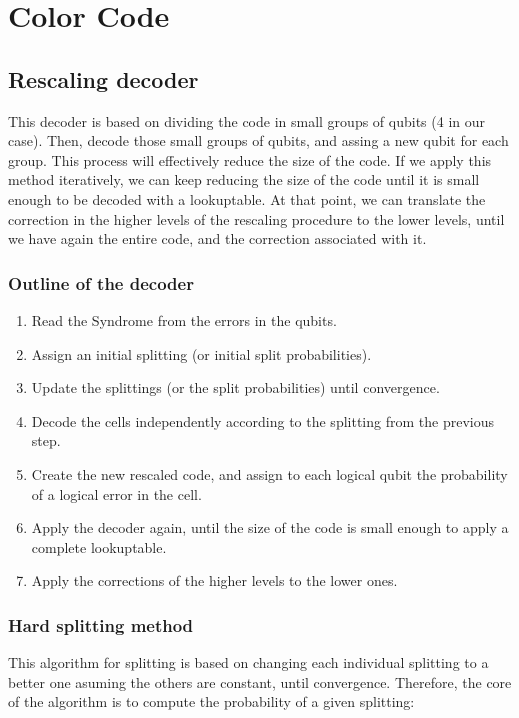 \documentclass[a4paper,12pt]{article}
\begin{document}
\newpage

\section{Color Code}
\subsection{Rescaling decoder}
This decoder is based on dividing the code in small groups of qubits (4 in our case). Then, decode those small groups of qubits, and assing a new qubit for each group. This process will effectively reduce the size of the code. If we apply this method iteratively, we can keep reducing the size of the code until it is small enough to be decoded with a lookuptable. At that point, we can translate the correction in the higher levels of the rescaling procedure to the lower levels, until we have again the entire code, and the correction associated with it.


\subsubsection{Outline of the decoder}

\begin{enumerate}
\item Read the Syndrome from the errors in the qubits.
\item Assign an initial splitting (or initial split probabilities).
\item Update the splittings (or the split probabilities) until convergence.
\item Decode the cells independently according to the splitting from the previous step.
\item Create the new rescaled code, and assign to each logical qubit the probability of a logical error in the cell.
\item Apply the decoder again, until the size of the code is small enough to apply a complete lookuptable.
\item Apply the corrections of the higher levels to the lower ones.


\end{enumerate}

\subsubsection{Hard splitting method}
This algorithm for splitting is based on changing each individual splitting to a better one asuming the others are constant, until convergence. Therefore, the core of the algorithm is to compute the probability of a given splitting:
\end{document}
